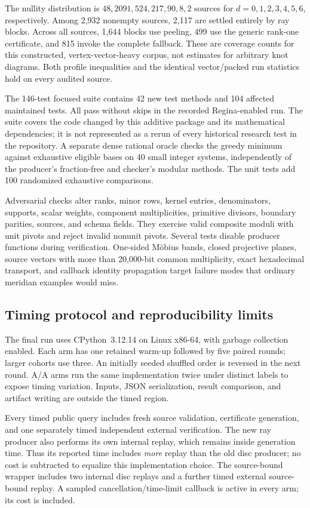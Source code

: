 The nullity distribution is $48,2091,524,217,90,8,2$ sources for
$d=0,1,2,3,4,5,6$, respectively.  Among 2,932 nonempty sources, 2,117 are
settled entirely by ray blocks.  Across all sources, 1,644 blocks use peeling,
499 use the generic rank-one certificate, and 815 invoke the complete fallback.
These are coverage counts for this constructed, vertex-vector-heavy corpus,
not estimates for arbitrary knot diagrams.  Both profile inequalities and the
identical vector/packed run statistics hold on every audited source.

The 146-test focused suite contains 42 new test methods and 104 affected
maintained tests.  All pass without skips in the recorded Regina-enabled run.
The suite covers the code changed by this additive package and its mathematical
dependencies; it is not represented as a rerun of every historical research
test in the repository.  A separate dense rational oracle checks the greedy
minimum against exhaustive eligible bases on 40 small integer systems,
independently of the producer's fraction-free and checker's modular methods.
The unit tests add 100 randomized exhaustive comparisons.

Adversarial checks alter ranks, minor rows, kernel entries, denominators,
supports, scalar weights, component multiplicities, primitive divisors,
boundary parities, sources, and schema fields.  They exercise valid composite
moduli with unit pivots and reject invalid nonunit pivots.  Several tests
disable producer functions during verification.  One-sided M\"obius bands,
closed projective planes, source vectors with more than 20,000-bit common
multiplicity, exact hexadecimal transport, and callback identity propagation
target failure modes that ordinary meridian examples would miss.

\subsection{Timing protocol and reproducibility limits}

The final run uses CPython~3.12.14 on Linux x86-64, with garbage collection
enabled.  Each arm has one retained warm-up followed by five paired rounds;
larger cohorts use three.  An initially seeded shuffled order is reversed in
the next round.  A/A arms run the same implementation twice under distinct
labels to expose timing variation.  Inputs, JSON serialization, result
comparison, and artifact writing are outside the timed region.

Every timed public query includes fresh source validation, certificate
generation, and one separately timed independent external verification.  The
new ray producer also performs its own internal replay, which remains inside
generation time.  Thus its reported time includes \emph{more} replay than
the old disc producer; no cost is subtracted to equalize this implementation
choice.  The source-bound wrapper includes two internal disc replays and a
further timed external source-bound replay.  A sampled cancellation/time-limit
callback is active in every arm; its cost is included.

